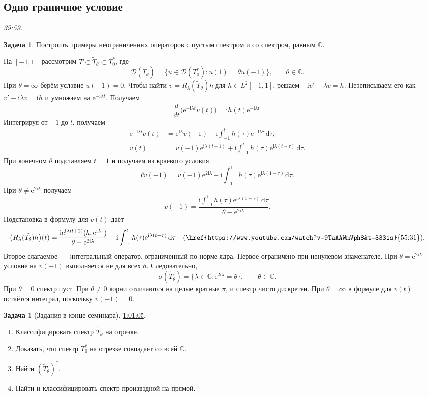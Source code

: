 \documentclass[11pt,a4paper]{article}
\theoremstyle{plain}
\theoremstyle{definition}
\newtheorem{exercise}[theorem]{Задача}
\newcommand{\CC}{\mathbb C}
\newcommand{\Dom}{\mathcal D}
\newcommand{\dd}{\,\mathrm d}
\newcommand{\ii}{\mathrm i}
\newcommand{\ee}{\mathrm e}
\newcommand{\at}[3]{\href{https://www.youtube.com/watch?v=#1&t=#2s}{#3}}
\newcommand{\topic}[2]{\Needspace{5\baselineskip}\subsection*{#1}\noindent\emph{#2.}\par\nobreak\smallskip}
\begin{document}
\topic{Одно граничное условие}{\at{9TaAAWmVph8}{2399}{39:59}}
\begin{exercise}
Построить примеры неограниченных операторов с пустым
спектром и со спектром, равным $\CC$.
\end{exercise}
На $[-1,1]$ рассмотрим $T\subset\widetilde T_\theta\subset T_0^*$,
где
\[
 \Dom(\widetilde T_\theta)
 =\{u\in\Dom(T_0^*):u(1)=\theta u(-1)\},\qquad \theta\in\CC.
\]
При $\theta=\infty$ берём условие $u(-1)=0$.
Чтобы найти $v=R_\lambda(\widetilde T_\theta)h$ для
$h\in L^2[-1,1]$, решаем $-\ii v'-\lambda v=h$.
Переписываем его как $v'-\ii\lambda v=\ii h$ и умножаем
на $\ee^{-\ii\lambda t}$. Получаем
\[
 \frac{d}{dt}\bigl(\ee^{-\ii\lambda t}v(t)\bigr)
 =\ii h(t)\ee^{-\ii\lambda t}.
\]
Интегрируя от $-1$ до $t$, получаем
\[
 \begin{aligned}
 \ee^{-\ii\lambda t}v(t)&=\ee^{\ii\lambda}v(-1)
      +\ii\int_{-1}^t h(\tau)\ee^{-\ii\lambda\tau}\dd\tau,\\
 v(t)&=v(-1)\ee^{\ii\lambda(t+1)}
      +\ii\int_{-1}^t h(\tau)\ee^{\ii\lambda(t-\tau)}\dd\tau.
 \end{aligned}
\]
При конечном $\theta$ подставляем $t=1$ и получаем
из краевого условия
\[
 \theta v(-1)=v(-1)\ee^{2\ii\lambda}
       +\ii\int_{-1}^1 h(\tau)\ee^{\ii\lambda(1-\tau)}\dd\tau.
\]
При $\theta\ne\ee^{2\ii\lambda}$ получаем
\[
 v(-1)=
 \frac{\ii\int_{-1}^1 h(\tau)\ee^{\ii\lambda(1-\tau)}\dd\tau}
      {\theta-\ee^{2\ii\lambda}}.
\]
Подстановка в формулу для $v(t)$ даёт
\[
 \bigl(R_\lambda(\widetilde T_\theta)h\bigr)(t)
 =\frac{\ii\ee^{\ii\lambda(t+2)}
            (h,\ee^{\ii\bar\lambda\,\cdot})}
        {\theta-\ee^{2\ii\lambda}}
   +\ii\int_{-1}^t h(\tau)\ee^{\ii\lambda(t-\tau)}\dd\tau
 \quad\text{(\at{9TaAAWmVph8}{3331}{55:31})}.
\]
Второе слагаемое~--- интегральный оператор, ограниченный
по норме ядра. Первое ограничено при ненулевом знаменателе.
При $\theta=\ee^{2\ii\lambda}$ условие на $v(-1)$
выполняется не для всех $h$. Следовательно,
\[
 \sigma(\widetilde T_\theta)=
   \{\lambda\in\CC:\ee^{2\ii\lambda}=\theta\},
   \qquad \theta\in\CC.
\]
При $\theta=0$ спектр пуст. При $\theta\ne0$ корни
отличаются на целые кратные $\pi$, и спектр чисто дискретен.
При $\theta=\infty$ в формуле для $v(t)$ остаётся интеграл,
поскольку $v(-1)=0$.

\begin{exercise}[Задания в конце семинара]
\at{9TaAAWmVph8}{3665}{1:01:05}.
\begin{enumerate}
\item Классифицировать спектр $\widetilde T_\theta$ на отрезке.
\item Доказать, что спектр $T_0^*$ на отрезке совпадает со всей $\CC$.
\item Найти $(\widetilde T_\theta)^*$.
\item Найти и классифицировать спектр производной на прямой.
\end{enumerate}
\end{exercise}
\end{document}
